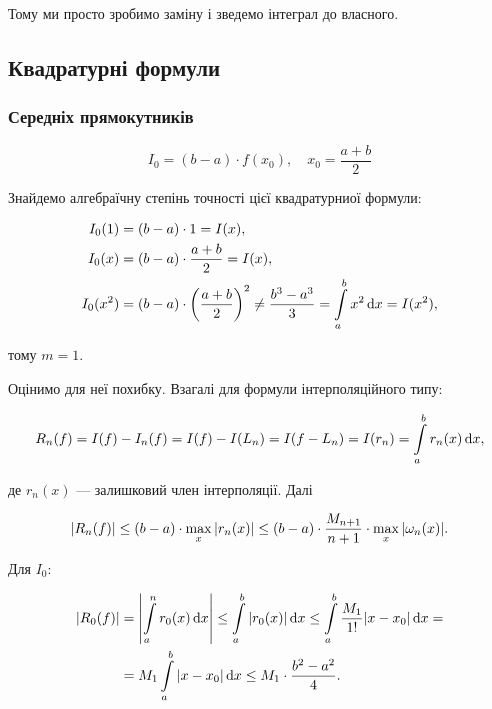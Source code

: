 Тому ми просто зробимо заміну і зведемо інтеграл до власного.

\subsection{Квадратурні формули}

\subsubsection{Середніх прямокутників}

\begin{equation}
	I_0 = (b - a) \cdot f(x_0), \quad x_0 = \frac{a + b}{2}
\end{equation}

Знайдемо алгебраїчну степінь точності цієї квадратурниої формули:

\begin{align}
	I_0(1) &= (b - a) \cdot 1 = I(x), \\
	I_0(x) &= (b - a) \cdot \frac{a + b}{2} = I(x), \\
	I_0(x^2) &= (b - a) \cdot \left(\frac{a + b}{2}\right)^2 \ne \frac{b^3 - a^3}{3} = \displaystyle\int\limits_a^b x^2 \mathop{}\!\mathrm{d} x = I(x^2),
\end{align}

тому $m = 1$. \medskip

Оцінимо для неї похибку. Взагалі для формули інтерполяційного типу:

\begin{equation}
	R_n(f) = I(f) - I_n(f) = I(f) - I(L_n) = I(f - L_n) = I(r_n) = \displaystyle\int\limits_a^b r_n(x) \mathop{}\!\mathrm{d} x,
\end{equation}

де $r_n(x)$ --- залишковий член інтерполяції. Далі

\begin{equation}
	|R_n(f)| \le (b - a) \cdot \displaystyle\max\limits_x |r_n(x)| \le (b - a) \cdot \frac{M_{n + 1}}{n + 1} \cdot \displaystyle\max\limits_x |\omega_n(x)|.
\end{equation}

Для $I_0$:

\begin{equation}
	\begin{aligned}
		|R_0(f)| &= \left| \displaystyle\int\limits_a^n r_0(x) \mathop{}\!\mathrm{d} x \right| \le \displaystyle\int\limits_a^b |r_0(x)| \mathop{}\!\mathrm{d} x \le \displaystyle\int\limits_a^b \frac{M_1}{1!} |x - x_0| \mathop{}\!\mathrm{d} x = \\
		&= M_1 \displaystyle\int\limits_a^b |x - x_0| \mathop{}\!\mathrm{d} x \le M_1 \cdot \frac{b^2 - a^2}{4}.
	\end{aligned}
\end{equation}

